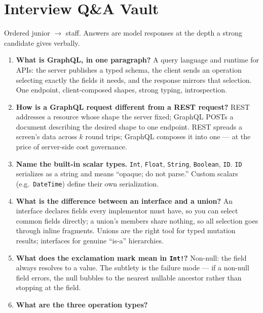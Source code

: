 \section{Interview Q\&A Vault}
\label{sec:ch12-interview-vault}

Ordered junior $\to$ staff. Answers are model responses at the depth a
strong candidate gives verbally.

\begin{enumerate}[label=\textbf{Q\arabic*.}, leftmargin=2.6em]
  \item \textbf{What is GraphQL, in one paragraph?}
        A query language and runtime for APIs: the server publishes a
        typed schema, the client sends an operation selecting exactly the
        fields it needs, and the response mirrors that selection. One
        endpoint, client-composed shapes, strong typing, introspection.
  \item \textbf{How is a GraphQL request different from a REST request?}
        REST addresses a resource whose shape the server fixed; GraphQL
        POSTs a document describing the desired shape to one endpoint.
        REST spreads a screen's data across $k$ round trips; GraphQL
        composes it into one --- at the price of server-side cost
        governance.
  \item \textbf{Name the built-in scalar types.}
        \texttt{Int}, \texttt{Float}, \texttt{String}, \texttt{Boolean},
        \texttt{ID}. \texttt{ID} serializes as a string and means
        ``opaque; do not parse.'' Custom scalars (e.g.\
        \texttt{DateTime}) define their own serialization.
  \item \textbf{What is the difference between an interface and a union?}
        An interface declares fields every implementor must have, so you
        can select common fields directly; a union's members share
        nothing, so all selection goes through inline fragments. Unions
        are the right tool for typed mutation results; interfaces for
        genuine ``is-a'' hierarchies.
  \item \textbf{What does the exclamation mark mean in \texttt{Int!}?}
        Non-null: the field always resolves to a value. The subtlety is
        the failure mode --- if a non-null field errors, the null bubbles
        to the nearest nullable ancestor rather than stopping at the
        field.
  \item \textbf{What are the three operation types?}

\end{enumerate}
